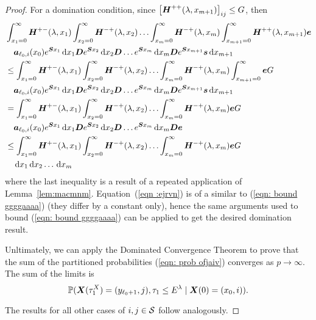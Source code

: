 \begin{proof}
	For a domination condition, since \(\left[\boldsymbol H^{++}(\lambda,x_{m+1})\right]_{ij}\leq G\), then 
	\begin{align}
			&\int_{x_1=0}^\infty \boldsymbol H^{+-}(\lambda,x_1)\nonumber
		\int_{x_2=0}^\infty \boldsymbol H^{-+}(\lambda,x_2) 
		\hdots \int_{x_m=0}^\infty \boldsymbol H^{-+}(\lambda, x_m) 
		\int_{x_{m+1}=0}^\infty \boldsymbol H^{++}(\lambda,x_{m+1}) \boldsymbol e 
		\\&\quad\boldsymbol   a_{\ell_0,i}(x_0)e^{\boldsymbol{S}x_1}\, \mathrm{d} x_1 \boldsymbol{D}e^{\boldsymbol{S}x_2} \, \mathrm{d} x_2 \boldsymbol{D}\dots e^{\boldsymbol{S}x_m} \, \mathrm{d} x_m \boldsymbol{D}e^{\boldsymbol{S}x_{m+1}}{\boldsymbol s} \, \mathrm{d} x_{m+1}\nonumber 
			\\&\leq \int_{x_1=0}^\infty \boldsymbol H^{+-}(\lambda,x_1)\nonumber
		\int_{x_2=0}^\infty \boldsymbol H^{-+}(\lambda,x_2) 
		\hdots \int_{x_m=0}^\infty \boldsymbol H^{-+}(\lambda, x_m) 
		\int_{x_{m+1}=0}^\infty \boldsymbol e G
		\\&\quad\boldsymbol   a_{\ell_0,i}(x_0)e^{\boldsymbol{S}x_1}\, \mathrm{d} x_1 \boldsymbol{D}e^{\boldsymbol{S}x_2} \, \mathrm{d} x_2 \boldsymbol{D}\dots e^{\boldsymbol{S}x_m} \, \mathrm{d} x_m \boldsymbol{D}e^{\boldsymbol{S}x_{m+1}}{\boldsymbol s} \, \mathrm{d} x_{m+1}\nonumber
		\\&=\int_{x_1=0}^\infty \boldsymbol H^{+-}(\lambda,x_1)\nonumber
		\int_{x_2=0}^\infty \boldsymbol H^{-+}(\lambda,x_2) 
		\hdots \int_{x_m=0}^\infty \boldsymbol H^{-+}(\lambda, x_m) 
		 \boldsymbol e G
		\\&\quad\boldsymbol   a_{\ell_0,i}(x_0)e^{\boldsymbol{S}x_1}\, \mathrm{d} x_1 \boldsymbol{D}e^{\boldsymbol{S}x_2} \, \mathrm{d} x_2 \boldsymbol{D}\dots e^{\boldsymbol{S}x_m} \, \mathrm{d} x_m \boldsymbol{D}{\boldsymbol e}\nonumber
			\\&\leq\int_{x_1=0}^\infty \boldsymbol H^{+-}(\lambda,x_1)\nonumber
		\int_{x_2=0}^\infty \boldsymbol H^{-+}(\lambda,x_2) 
		\hdots \int_{x_m=0}^\infty \boldsymbol H^{-+}(\lambda, x_m) 
		 \boldsymbol e G
		\\&\quad \, \mathrm{d} x_1 \, \mathrm{d} x_2\dots \, \mathrm{d} x_m \label{eqn :ejrvn}
	\end{align}
	where the last inequality is a result of a repeated application of Lemma~\ref{lem:macmnm}. Equation~(\ref{eqn :ejrvn}) is of a similar to (\ref{eqn: bound ggggaaaa}) (they differ by a constant only), hence the same arguments used to bound (\ref{eqn: bound ggggaaaa}) can be applied to get the desired domination result. 
	
	Unltimately, we can apply the Dominated Convergence Theorem to prove that the sum of the partitioned probabilities (\ref{eqn: prob ofjaiv}) converges as \(p\to\infty\). The sum of the limits is 
	\[\mathbb P(\boldsymbol X(\tau_1^X) = (y_{\ell_0+1}, j), \tau_{1}\leq E^\lambda 
            	 \mid \boldsymbol X(0) = (x_0,i)).\]
	 
	 The results for all other cases of \(i,j\in\mathcal{S}\) follow analogously.
\end{proof}


